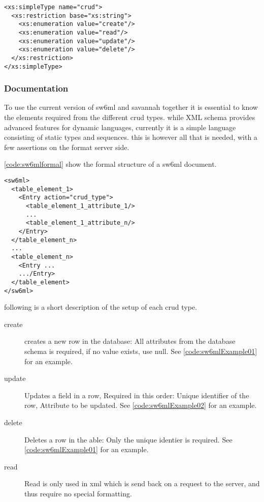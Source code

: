 \begin{lstlisting}[label=code:sw6mlCrud,caption=sw6ml crud simple type]
 <xs:simpleType name="crud">
  <xs:restriction base="xs:string">
    <xs:enumeration value="create"/>
    <xs:enumeration value="read"/>
    <xs:enumeration value="update"/>
    <xs:enumeration value="delete"/>
  </xs:restriction>
</xs:simpleType>
\end{lstlisting}

\subsubsection{Documentation}
\label{sw6mlusage}
To use the current version of sw6ml and savannah together it is essential to know the elements required from the different crud types.
while XML schema provides advanced features for dynamic languages, currently it is a simple language consisting of static types and sequences.
this is however all that is needed, with a few assertions on the format server side.

\ref{code:sw6mlformal} show the formal structure of a sw6ml document.
\begin{lstlisting}[label=code:sw6mlformal,caption=root and table elements]
<sw6ml> 
  <table_element_1>
    <Entry action="crud_type">
      <table_element_1_attribute_1/>
      ...
      <table_element_1_attribute_n/>
    </Entry>
  </table_element_n>
  ...
  <table_element_n>
    <Entry ...
    .../Entry>
  </table_element>
</sw6ml>
\end{lstlisting}

following is a short description of the setup of each crud type.

\begin{description}
 \item[create] creates a new row in the database: All attributes from the database schema is required, if no value exists, use null. See \ref{code:sw6mlExample01} for an example.
 \item[update] Updates a field in a row, Required in this order: Unique identifier of the row, Attribute to be updated. See \ref{code:sw6mlExample02} for an example.
 \item[delete] Deletes a row in the able: Only the unique identier is required. See \ref{code:sw6mlExample01} for an example.
 \item[read]   Read is only used in xml which is send back on a request to the server, and thus require no special formatting.
\end{description}

